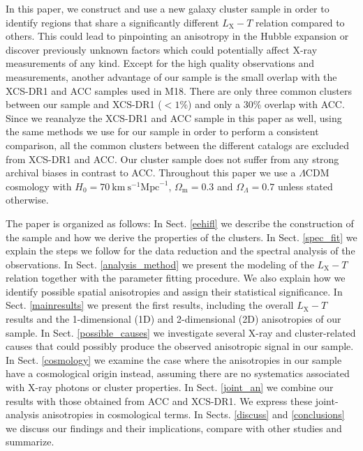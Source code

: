 \documentclass{aa}   %
\begin{document}
In this paper, we construct and use a new galaxy cluster sample in order to identify regions that share a significantly different $L_{\text{X}}-T$ relation compared to others. This could lead to pinpointing an anisotropy in the Hubble expansion or discover previously unknown factors which could potentially affect X-ray measurements of any kind. Except for the high quality observations and measurements, another advantage of our sample is the small overlap with the XCS-DR1 \citep{mehrt} and ACC \citep{horner} samples used in M18. There are only three common clusters between our sample and XCS-DR1 ($<1\%$) and only a 30\% overlap with ACC. Since we reanalyze the XCS-DR1 and ACC sample in this paper as well, using the same methods we use for our sample in order to perform a consistent comparison, all the common clusters between the different catalogs are excluded from XCS-DR1 and ACC. Our cluster sample does not suffer from any strong archival biases in contrast to ACC. Throughout this paper we use a $\Lambda$CDM cosmology with $H_0=70\  \text{km}\  \text{s}^{-1} \text{Mpc}^{-1}$, $\Omega_{\text{m}}=0.3$ and $\Omega_{\Lambda}=0.7$ unless stated otherwise. 

The paper is organized as follows: In Sect. \ref{eehifl} we describe the construction of the sample and how we derive the properties of the clusters. In Sect. \ref{spec_fit} we explain the steps we follow for the data reduction and the spectral analysis of the observations. In Sect. \ref{analysis_method} we present the modeling of the $L_{\text{X}}-T$ relation together with the parameter fitting procedure. We also explain how we identify possible spatial anisotropies and assign their statistical significance. In Sect. \ref{mainresults} we present the first results, including the overall $L_{\text{X}}-T$ results and the 1-dimensional (1D) and 2-dimensional (2D) anisotropies of our sample. In Sect. \ref{possible_causes} we investigate several X-ray and cluster-related causes that could possibly produce the observed anisotropic signal in our sample. In Sect. \ref{cosmology} we examine the case where the anisotropies in our sample have a cosmological origin instead, assuming there are no systematics associated with X-ray photons or cluster properties. In Sect. \ref{joint_an} we combine our results with those obtained from ACC and XCS-DR1. We express these joint-analysis anisotropies in cosmological terms. In Sects. \ref{discuss} and \ref{conclusions} we discuss our findings and their implications, compare with other studies and summarize.
\end{document}
